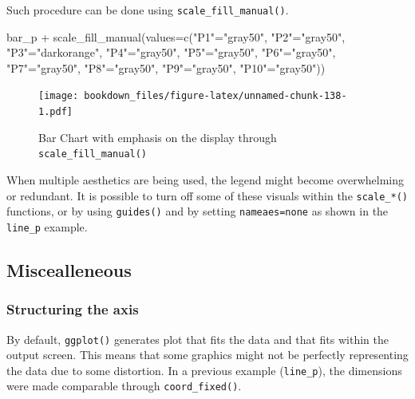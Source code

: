 \documentclass[
]{krantz}
\makeatletter
\newenvironment{Shaded}{\begin{snugshade}}{\end{snugshade}}
\newcommand{\AttributeTok}[1]{\textcolor[rgb]{0.61,0.61,0.61}{#1}}
\newcommand{\FunctionTok}[1]{\textcolor[rgb]{0,0,0}{#1}}
\newcommand{\NormalTok}[1]{#1}
\newcommand{\OtherTok}[1]{\textcolor[rgb]{0.37,0.37,0.37}{#1}}
\newcommand{\SpecialCharTok}[1]{\textcolor[rgb]{0,0,0}{#1}}
\newcommand{\StringTok}[1]{\textcolor[rgb]{0.5,0.5,0.5}{#1}}
\newenvironment{kframe}{%
\medskip{}
\setlength{\fboxsep}{.8em}
 \def\at@end@of@kframe{}%
 \ifinner\ifhmode%
  \def\at@end@of@kframe{\end{minipage}}%
  \begin{minipage}{\columnwidth}%
 \fi\fi%
 \def\FrameCommand##1{\hskip\@totalleftmargin \hskip-\fboxsep
 \colorbox{shadecolor}{##1}\hskip-\fboxsep
     \hskip-\linewidth \hskip-\@totalleftmargin \hskip\columnwidth}%
 \MakeFramed {\advance\hsize-\width
   \@totalleftmargin\z@ \linewidth\hsize
   \@setminipage}}%
 {\par\unskip\endMakeFramed%
 \at@end@of@kframe}
\renewenvironment{Shaded}{\begin{kframe}}{\end{kframe}}
\makeatother
\begin{document}
Such procedure can be done using \texttt{scale\_fill\_manual()}.

\begin{Shaded}
\begin{Highlighting}[]
\NormalTok{bar\_p }\SpecialCharTok{+} 
  \FunctionTok{scale\_fill\_manual}\NormalTok{(}\AttributeTok{values=}\FunctionTok{c}\NormalTok{(}\StringTok{"P1"}\OtherTok{=}\StringTok{"gray50"}\NormalTok{, }\StringTok{"P2"}\OtherTok{=}\StringTok{"gray50"}\NormalTok{, }
                             \StringTok{"P3"}\OtherTok{=}\StringTok{"darkorange"}\NormalTok{, }\StringTok{"P4"}\OtherTok{=}\StringTok{"gray50"}\NormalTok{, }
                             \StringTok{"P5"}\OtherTok{=}\StringTok{"gray50"}\NormalTok{, }\StringTok{"P6"}\OtherTok{=}\StringTok{"gray50"}\NormalTok{,}
                             \StringTok{"P7"}\OtherTok{=}\StringTok{"gray50"}\NormalTok{, }\StringTok{"P8"}\OtherTok{=}\StringTok{"gray50"}\NormalTok{,}
                             \StringTok{"P9"}\OtherTok{=}\StringTok{"gray50"}\NormalTok{, }\StringTok{"P10"}\OtherTok{=}\StringTok{"gray50"}\NormalTok{))}
\end{Highlighting}
\end{Shaded}

\begin{figure}
\centering
\texttt{[image: bookdown\_files/figure-latex/unnamed-chunk-138-1.pdf]}
\caption{\label{fig:unnamed-chunk-138}Bar Chart with emphasis on the display through \texttt{scale\_fill\_manual()}}
\end{figure}

When multiple aesthetics are being used, the legend might become overwhelming or redundant. It is possible to turn off some of these visuals within the \texttt{scale\_*()} functions, or by using \texttt{guides()} and by setting \texttt{nameaes=\textquotesingle{}none\textquotesingle{}} as shown in the \texttt{line\_p} example.

\hypertarget{miscealleneous}{%
\subsection{Miscealleneous}\label{miscealleneous}}

\hypertarget{structureaxis}{%
\subsubsection*{Structuring the axis}\label{structureaxis}}


By default, \texttt{ggplot()} generates plot that fits the data and that fits within the output screen. This means that some graphics might not be perfectly representing the data due to some distortion. In a previous example (\texttt{line\_p}), the dimensions were made comparable through \texttt{coord\_fixed()}.
\end{document}
